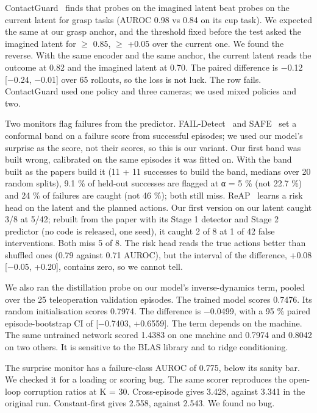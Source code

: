 \documentclass[10pt,twocolumn]{article}
\begin{document}
ContactGuard~\citep{zheng2026contactguard} finds that probes on the imagined latent beat probes on the current latent for grasp tasks (AUROC 0.98 vs 0.84 on its cup task). We expected the same at our grasp anchor, and the threshold fixed before the test asked the imagined latent for $\geq$ 0.85, $\geq$ +0.05 over the current one. We found the reverse. With the same encoder and the same anchor, the current latent reads the outcome at 0.82 and the imagined latent at 0.70. The paired difference is −0.12 [−0.24, −0.01] over 65 rollouts, so the loss is not luck. The row fails. ContactGuard used one policy and three cameras; we used mixed policies and two.


Two monitors flag failures from the predictor. FAIL-Detect~\citep{xu2025faildetect} and SAFE~\citep{gu2025safe} set a conformal band on a failure score from successful episodes; we used our model's surprise as the score, not their scores, so this is our variant. Our first band was built wrong, calibrated on the same episodes it was fitted on. With the band built as the papers build it (11 + 11 successes to build the band, medians over 20 random splits), 9.1 \% of held-out successes are flagged at α = 5 \% (not 22.7 \%) and 24 \% of failures are caught (not 46 \%); both still miss. ReAP~\citep{liu2026reap} learns a risk head on the latent and the planned actions. Our first version on our latent caught 3/8 at 5/42; rebuilt from the paper with its Stage 1 detector and Stage 2 predictor (no code is released, one seed), it caught 2 of 8 at 1 of 42 false interventions. Both miss 5 of 8. The risk head reads the true actions better than shuffled ones (0.79 against 0.71 AUROC), but the interval of the difference, +0.08 [−0.05, +0.20], contains zero, so we cannot tell.


We also ran the distillation probe on our model's inverse-dynamics term, pooled over the 25 teleoperation validation episodes. The trained model scores 0.7476. Its random initialisation scores 0.7974. The difference is −0.0499, with a 95 \% paired episode-bootstrap CI of [−0.7403, +0.6559]. The term depends on the machine. The same untrained network scored 1.4383 on one machine and 0.7974 and 0.8042 on two others. It is sensitive to the BLAS library and to ridge conditioning.


The surprise monitor has a failure-class AUROC of 0.775, below its sanity bar. We checked it for a loading or scoring bug. The same scorer reproduces the open-loop corruption ratios at K = 30. Cross-episode gives 3.428, against 3.341 in the original run. Constant-first gives 2.558, against 2.543. We found no bug.
\end{document}
